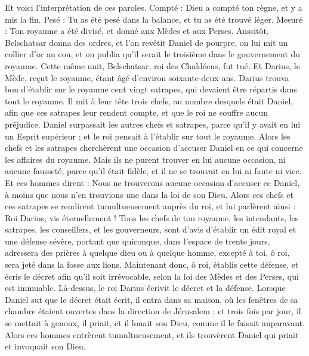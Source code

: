 \begin{multicols}{2}
Et voici l'interprétation de ces paroles. Compté : Dieu a compté ton règne, et y a mis la fin.
Pesé : Tu as été pesé dans la balance, et tu as été trouvé léger.
Mesuré : Ton royaume a été divisé, et donné aux Mèdes et aux Perses.
Aussitôt, Belschatsar donna des ordres, et l’on revêtit Daniel de pourpre, on lui mit un collier d'or au cou, et on publia qu'il serait le troisième dans le gouvernement du royaume.
Cette même nuit, Belschatsar, roi des Chaldéens, fut tué.
Et Darius, le Mède, reçut le royaume, étant âgé d'environ soixante-deux ans.
\VerseOne{}Darius trouva bon d'établir sur le royaume cent vingt satrapes, qui devaient être répartis dans tout le royaume.
Il mit à leur tête trois chefs, au nombre desquels était Daniel, afin que ces satrapes leur rendent compte, et que le roi ne souffre aucun préjudice.
Daniel surpassait les autres chefs et satrapes, parce qu'il y avait en lui un Esprit supérieur ; et le roi pensait à l'établir sur tout le royaume.
Alors les chefs et les satrapes cherchèrent une occasion d'accuser Daniel en ce qui concerne les affaires du royaume.  Mais ils ne purent trouver en lui aucune occasion,  ni aucune fausseté, parce qu'il était fidèle, et il ne se trouvait en lui ni faute ni vice.
Et ces hommes dirent : Nous ne trouverons aucune occasion d'accuser ce Daniel, à moins que nous n’en trouvions une dans la loi de son Dieu.
Alors ces chefs et ces satrapes se rendirent tumultueusement auprès du roi, et lui parlèrent ainsi : Roi Darius, vis éternellement !
Tous les chefs de ton royaume, les intendants, les satrapes, les conseillers, et les gouverneurs, sont d'avis d'établir un édit royal et une défense sévère, portant que quiconque, dans l’espace de trente jours, adressera des prières à quelque dieu ou à quelque homme, excepté à toi, ô roi, sera jeté dans la fosse aux lions.
Maintenant donc, ô roi, établis cette défense, et écris le décret afin qu’il soit irrévocable, selon la loi des Mèdes et des Perses, qui est immuable.
Là-dessus, le roi Darius écrivit le décret et la défense.
Lorsque Daniel sut que le décret était écrit, il entra dans sa maison, où les fenêtres de sa chambre étaient ouvertes dans la direction de Jérusalem ; et trois fois par jour, il se mettait à genoux, il priait, et il louait son Dieu, comme il le faisait auparavant.
Alors ces hommes entrèrent tumultueusement, et ils trouvèrent Daniel qui priait et invoquait son Dieu.

\end{multicols}
